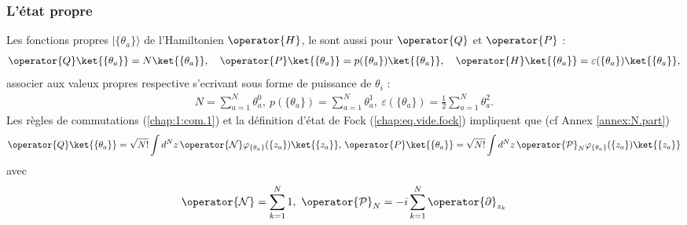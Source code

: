 \subsubsection{L’état propre}
Les fonctions propres $\vert \{\theta_a\}\rangle$ de l'Hamiltonien $\operator{H}$, le sont aussi pour $\operator{Q}$ et $\operator{P}$ :
\begin{eqnarray}
	 \operator{Q} \ket{\{\theta_a\}} = N \ket{\{\theta_a\}}, \quad \operator{P} \ket{\{\theta_a\}} = p(\{\theta_a\}) \ket{\{\theta_a\}} , \quad  \operator{H} \ket{\{\theta_a\}} = \varepsilon(\{\theta_a\}) \ket{\{\theta_a\}},	
\end{eqnarray}
associer aux valeux propres respective s'ecrivant sous forme de puissance de $\theta_i$ :
\begin{eqnarray}
	N = \sum_{a = 1}^N \theta_a^0 , ~ p(\{\theta_a\}) = \sum_{a = 1}^N \theta_a^1 ,~\varepsilon(\{\theta_a\}) = \frac{1}{2}\sum_{a = 1}^N \theta_a^2.	
\end{eqnarray}
Les règles de commutations (\ref{chap:1:com.1}) et la définition d'état de Fock (\ref{chap:eq.vide.fock}) impliquent que (cf Annex \ref{annex:N.part})
\begin{eqnarray}
	\operator{Q}\ket{\{\theta_a\}} =  \sqrt{N!}\int d^Nz \, \operator{\mathcal{N}} \varphi_{\{\theta_a\}}(\{z_a\} )\ket{\{z_a\}}, \, \operator{P}\ket{\{\theta_a\}} =  \sqrt{N!}\int d^Nz \, \operator{\mathcal{P}}_N \varphi_{\{\theta_a\}}(\{z_a\} )\ket{\{z_a\}} 
\end{eqnarray}
avec 
\begin{eqnarray}
	\operator{ \mathcal{N}}  =  \sum_{k = 1}^N 1,~\operator{ \mathcal{P}}_N  =- i\sum_{k = 1}^N \operator{\partial}_{z_k}	
\end{eqnarray}




